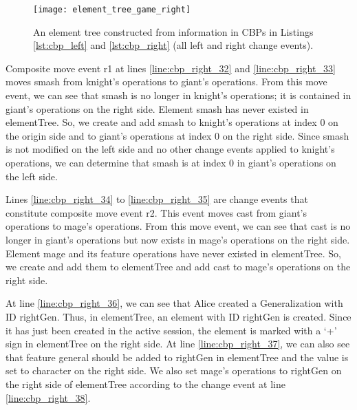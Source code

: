 \begin{figure}[ht]
  \centering
  \texttt{[image: element\_tree\_game\_right]}
  \caption{An element tree constructed from information in CBPs in Listings \ref{lst:cbp_left} and \ref{lst:cbp_right} (all left and right change events).}
  \label{fig:right_element_tree_diagram}
\end{figure}

Composite move event \textsf{r1} at lines \ref{line:cbp_right_32} and \ref{line:cbp_right_33} moves \textsf{smash} from \textsf{knight}’s \textsf{operations} to \textsf{giant}’s \textsf{operations}. From this move event, we can see that \textsf{smash} is no longer in \textsf{knight}’s \textsf{operations}; it is contained in \textsf{giant}’s \textsf{operations} on the right side. Element \textsf{smash} has never existed in \textsf{elementTree}. So, we create and add \textsf{smash} to \textsf{knight}’s \textsf{operations} at index 0 on the origin side and to \textsf{giant}’s \textsf{operations} at index 0 on the right side. Since \textsf{smash} is not modified on the left side and no other change events applied to \textsf{knight}’s \textsf{operations}, we can determine that \textsf{smash} is at index 0 in \textsf{giant}’s \textsf{operations} on the left side.

Lines \ref{line:cbp_right_34} to \ref{line:cbp_right_35} are change events that constitute composite move event \textsf{r2}. This event moves \textsf{cast} from \textsf{giant}’s \textsf{operations} to \textsf{mage}’s \textsf{operations}. From this move event, we can see that \textsf{cast} is no longer in \textsf{giant}’s \textsf{operations} but now exists in \textsf{mage}’s \textsf{operations} on the right side. Element \textsf{mage} and its feature \textsf{operations} have never existed in \textsf{elementTree}. So, we create and add them to \textsf{elementTree} and add \textsf{cast} to \textsf{mage}’s \textsf{operations} on the right side.

At line \ref{line:cbp_right_36}, we can see that Alice created a \textsf{Generalization} with ID \textsf{rightGen}. Thus, in \textsf{elementTree}, an element with ID \textsf{rightGen} is created. Since it has just been created in the active session, the element is marked with a ‘+’ sign in \textsf{elementTree} on the right side. At line \ref{line:cbp_right_37}, we can also see that feature \textsf{general} should be added to \textsf{rightGen} in \textsf{elementTree} and the value is set to \textsf{character} on the right side. We also set \textsf{mage}’s \textsf{operations} to \textsf{rightGen} on the right side of \textsf{elementTree} according to the change event at line \ref{line:cbp_right_38}.

